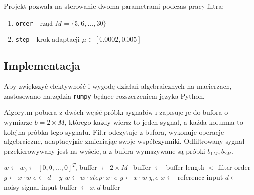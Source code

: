 Projekt pozwala na sterowanie dwoma parametrami podczas pracy filtra:
\begin{enumerate}
\item \texttt{order} - rząd $M = \{5,6,...,30\}$
\item \texttt{step} - krok adaptacji $\mu \in [0.0002, 0.005]$
\end{enumerate}

\subsection{Implementacja}
Aby zwiększyć efektywność i wygodę działań algebraicznych na macierzach, zastosowano narzędzia \texttt{numpy} będące rozszerzeniem języka Python.

Algorytm pobiera z dwóch wejść próbki sygnałów i zapisuje je do bufora o wymiarze $b = 2 \times M$, którego każdy wiersz to jeden sygnał, a każda kolumna to kolejna próbka tego sygnału. Filtr odczytuje z bufora, wykonuje operacje algebraiczne, adaptacyjnie zmieniając swoje współczynniki. Odfiltrowany sygnał przekierowywany jest na wyście, a z bufora wymazywane są próbki $b_{1M}, b_{2M}$.



\begin{algorithmic}
\Require $w \gets w_0 \gets [0, 0,...,0]^{T}$,
\State buffer $\gets 2 \times M$
    \Repeat\ buffer $\gets$  \Until buffer length $<$ filter order
    \State {}
    \State {}
\EndWhile
{}
    \State $y \gets x \cdot w$
    \State $e \gets d - y$
    \State $w \gets  w \cdot step \cdot x \cdot e$
    \State $y \gets x \cdot w$
    \State \Return $y, e$
\EndFor
\EndFunction
{}
    \State $x \gets$ reference input
    \State $d \gets$ noisy signal input
    \State buffer $\gets x, d$
    \State \Return buffer
\EndFunction
\end{algorithmic}


